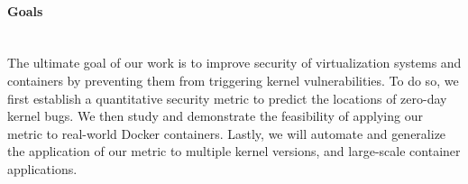 \paragraph{Goals}\mbox{}\\

The ultimate goal of our work is to improve security of virtualization systems and containers by preventing them from triggering kernel vulnerabilities. 
To do so, we first establish a quantitative security metric to predict the locations of zero-day kernel bugs. 
We then study and demonstrate the feasibility of applying our metric to real-world Docker containers. 
Lastly, we will automate and generalize the application of our metric to multiple kernel versions, and large-scale container applications. 